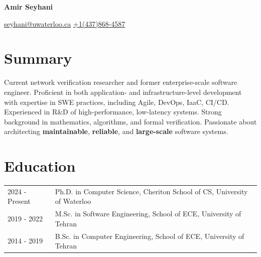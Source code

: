 \documentclass[a4paper,12pt]{article}
\begin{document}
    \noindent
    \begin{minipage}[t]{0.50\textwidth} %
    {\Huge \textbf{Amir Seyhani}}
    \end{minipage}%
    \hfill
    \begin{minipage}[t]{0.5\textwidth} %
        \raggedleft
        \small
        \href{mailto:seyhani@uwaterloo.ca}{seyhani@uwaterloo.ca}
        \textbar
        \hspace{0.05em}
        \href{tel:+14378684587}{+1(437)868-4587}
        \textbar
        \hspace{0.05em}
        \href{https://github.com/seyhani}{\faGithub}
        \textbar
        \hspace{0.05em}
        \href{https://www.linkedin.com/in/aseyhani}{\faLinkedin}
        \textbar
        \hspace{0.05em}
        \href{https://scholar.google.com/citations?user=D8Dmb1gAAAAJ&hl=en}{\faGraduationCap} \\
    \end{minipage}

    \pagestyle{empty}
    \section{Summary}
    Current network verification researcher and former enterprise-scale software engineer. Proficient in both application- and infrastructure-level development with expertise in SWE practices, including Agile, DevOps, IaaC, CI/CD. Experienced in R\&D of high-performance, low-latency systems. Strong background in mathematics, algorithms, and formal verification. Passionate about architecting \textbf{maintainable}, \textbf{reliable}, and \textbf{large-scale} software systems.
    
    \section{Education}
    \begin{tabularx}{\linewidth}{@{}l X@{}}
        2024 - Present & Ph.D. in Computer Science, Cheriton School of CS, University of Waterloo   \\ %
        2019 - 2022 & M.Sc. in Software Engineering, School of ECE, University of Tehran  \\ %
        2014 - 2019 & B.Sc. in Computer Engineering, School of ECE, University of Tehran  \\ %
    \end{tabularx}
    
\end{document}
